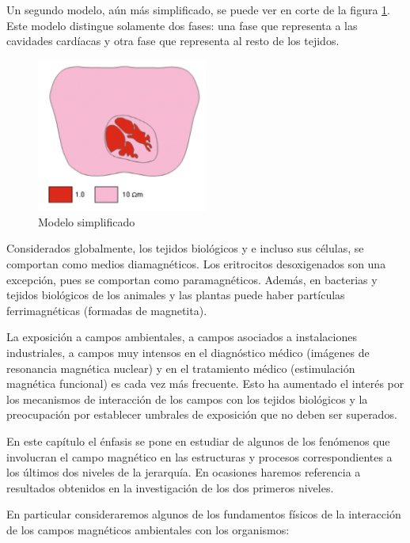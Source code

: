 Un segundo modelo, aún más simplificado, se puede ver en corte de la figura \ref{fig:62}. Este modelo distingue solamente dos fases: una fase que representa a las cavidades cardíacas y otra fase que representa al resto de los tejidos.

\begin{figure}[H]
    \centering
    \includegraphics[width=0.5\textwidth]{./Figures/fig62}
	\caption{Modelo simplificado}
	\label{fig:62}
\end{figure}

Considerados globalmente, los tejidos biológicos y e incluso sus células, se comportan como medios diamagnéticos. Los eritrocitos desoxigenados son una excepción, pues se comportan como paramagnéticos. Además, en bacterias y tejidos biológicos de los animales y las plantas puede haber partículas ferrimagnéticas (formadas de magnetita).

La exposición a campos ambientales, a campos asociados a instalaciones industriales, a campos muy intensos en el diagnóstico médico (imágenes de resonancia magnética nuclear) y en el tratamiento médico (estimulación magnética funcional) es cada vez más frecuente. Esto ha aumentado el interés por los mecanismos de interacción de los campos con los tejidos biológicos y la preocupación por establecer umbrales de exposición que no deben ser superados.

En este capítulo el énfasis se pone en estudiar de algunos de los fenómenos que involucran el campo magnético en las estructuras y procesos correspondientes a los últimos dos niveles de la jerarquía. En ocasiones haremos referencia a resultados obtenidos en la investigación de los dos primeros niveles.

En particular consideraremos algunos de los fundamentos físicos de la interacción de los campos magnéticos ambientales con los organismos:

